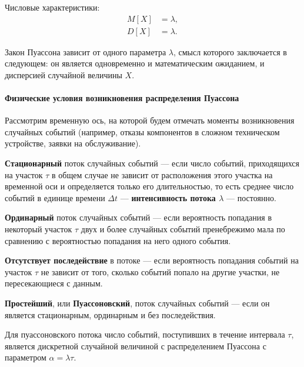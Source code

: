 \documentclass[a4paper]{article}
\newcommand{\key}[1]{{\color{Medium}\bfseries #1}}
\begin{document}
                Числовые характеристики:
                \begin{equation*}
                    \begin{aligned}
                        M[X] & = \lambda , \\[1.0ex]
                        D[X] & = \lambda .
                    \end{aligned}
                \end{equation*}

                Закон Пуассона зависит от одного параметра $\lambda$, смысл которого заключается в следующем: он является одновременно и математическим ожиданием, и дисперсией случайной величины $X$.

                \paragraph{Физические условия возникновения распределения Пуассона}

                    Рассмотрим временную ось, на которой будем отмечать моменты возникновения случайных событий (например, отказы компонентов в сложном техническом устройстве, заявки на обслуживание).
                    
                    \key{Стационарный} поток случайных событий --- если число событий, приходящихся на участок $\tau$ в общем случае не зависит от расположения этого участка на временной оси и определяется только его длительностью, то есть среднее число событий в единице времени $\Delta t$ --- \key{интенсивность потока \boldmath$\lambda$} --- постоянно.
                    
                    \key{Ординарный} поток случайных событий --- если вероятность попадания в некоторый участок $\tau$ двух и более случайных событий пренебрежимо мала по сравнению с вероятностью попадания на него одного события.
                    
                    \key{Отсутствует последействие} в потоке --- если вероятность попадания событий на участок $\tau$ не зависит от того, сколько событий попало на другие участки, не пересекающиеся с данным.
                    
                    \key{Простейший}, или \key{Пуассоновский}, поток случайных событий --- если он является стационарным, ординарным и без последействия.
                    
                    Для пуассоновского потока число событий, поступивших в течение интервала $\tau$, является дискретной случайной величиной с распределением Пуассона с параметром $\alpha = \lambda \tau$.
\end{document}
